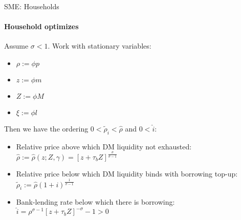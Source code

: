\documentclass[10pt,english,slidetop,compress,
              blue,mathserif,color=option]{beamer}
\theoremstyle{plain}
\theoremstyle{definition}
\begin{document}
\begin{frame}[allowframebreaks]{SME: Households}
  \framesubtitle{Household optimizes}

  Assume $\sigma < 1$. Work with stationary variables:
  \begin{itemize}
    \item $\rho := \phi p$
    \item $z := \phi m$
    \item $Z := \phi M$
    \item $\xi := \phi l$
  \end{itemize}


  Then we have the ordering $0  < \tilde{\rho}_i < \hat{\rho}$ and $0 < \hat{i}$:



    \begin{itemize}
      \item Relative price above which DM liquidity not exhausted: $\hat{\rho}
      :=\hat{\rho}(z;Z,\gamma)
      =\left[z+\tau_{b}Z\right]^{\frac{\sigma}{\sigma-1}}$

      \item Relative price below which DM liquidity binds with borrowing top-up: $\tilde{\rho}_i:=\hat{\rho}\left(1+i\right)^{\frac{1}{\sigma-1}}$

      \item Bank-lending rate below which there is borrowing: $\hat{i}=\rho^{\sigma-1}\left[z+\tau_{b}Z\right]^{-\sigma}-1>0$
    \end{itemize}






\end{frame}
\end{document}
